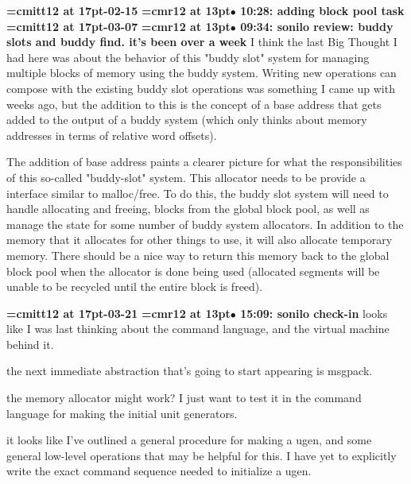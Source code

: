 {\medskip\noindent\bf\font\titlefont=cmitt12 at 17pt-02-15}\medskip
{\smallskip\noindent\bf\font\titlefont=cmr12 at 13pt\titlefont $\bullet$ 10:28: adding block pool task}\smallskip
{\medskip\noindent\bf\font\titlefont=cmitt12 at 17pt-03-07}\medskip
{\smallskip\noindent\bf\font\titlefont=cmr12 at 13pt\titlefont $\bullet$ 09:34: sonilo review: buddy slots and buddy find. it's been over a week}\smallskip
I think the last Big Thought I had here was about the behavior of this "buddy slot" system for managing multiple blocks of memory using the buddy system. Writing new operations can compose with the existing buddy slot operations was something I came up with weeks ago, but the addition to this is the concept of a base address that gets added to the output of a buddy system (which only thinks about memory addresses in terms of relative word offsets).
\par

The addition of base address paints a clearer picture for what the responsibilities of this so-called "buddy-slot" system. This allocator needs to be provide a interface similar to malloc/free. To do this, the buddy slot system will need to handle allocating and freeing, blocks from the global block pool, as well as manage the state for some number of buddy system allocators. In addition to the memory that it allocates for other things to use, it will also allocate temporary memory. There should be a nice way to return this memory back to the global block pool when the allocator is done being used (allocated segments will be unable to be recycled until the entire block is freed).
\par

{\medskip\noindent\bf\font\titlefont=cmitt12 at 17pt-03-21}\medskip
{\smallskip\noindent\bf\font\titlefont=cmr12 at 13pt\titlefont $\bullet$ 15:09: sonilo check-in}\smallskip
looks like I was last thinking about the command language, and the virtual machine behind it.
\par

the next immediate abstraction that's going to start appearing is msgpack.
\par

the memory allocator might work? I just want to test it in the command language for making the initial unit generators.
\par

it looks like I've outlined a general procedure for making a ugen, and some general low-level operations that may be helpful for this. I have yet to explicitly write the exact command sequence needed to initialize a ugen.
\par

